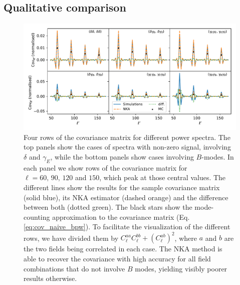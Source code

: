 \documentclass[a4paper,11pt]{article}
\begin{document}
    \subsection{Qualitative comparison}\label{ssec:results.visual}
      \begin{figure}
        \centering
        \includegraphics[width=\textwidth]{./figures/all_rows_sph_1bin.pdf}
        \caption{Four rows of the covariance matrix for different power spectra. The top panels show the cases of spectra with non-zero signal, involving $\delta$ and $\gamma_E$, while the bottom panels show cases involving $B$-modes. In each panel we show rows of the covariance matrix for $\ell=60,\,90,\,120$ and $150$, which peak at those central values. The different lines show the results for the sample covariance matrix (solid blue), its NKA estimator (dashed orange) and the difference between both (dotted green). The black stars show the mode-counting approximation to the covariance matrix (Eq. \ref{eq:cov_naive_bpw}). To facilitate the visualization of the different rows, we have divided them by $C_\ell^{aa}C_\ell^{bb}+(C^{ab}_\ell)^2$, where $a$ and $b$ are the two fields being correlated in each case. The NKA method is able to recover the covariance with high accuracy for all field combinations that do not involve $B$ modes, yielding visibly poorer results otherwise.}
        \label{fig:rows_1bin}
      \end{figure}
\end{document}

